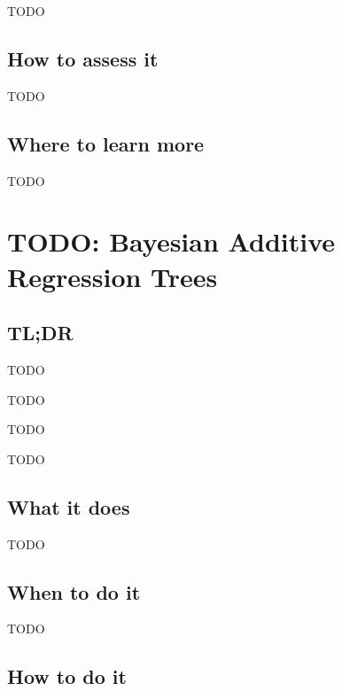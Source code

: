 \documentclass[
]{book}
\providecommand{\tightlist}{%
  \setlength{\itemsep}{0pt}\setlength{\parskip}{0pt}}
\begin{document}
TODO

\hypertarget{how-to-assess-it-17}{%
\section{How to assess it}\label{how-to-assess-it-17}}

TODO

\hypertarget{where-to-learn-more-17}{%
\section{Where to learn more}\label{where-to-learn-more-17}}

TODO

\hypertarget{bayesian-additive-regression-trees}{%
\chapter{TODO: Bayesian Additive Regression Trees}\label{bayesian-additive-regression-trees}}

\hypertarget{tldr-18}{%
\section{TL;DR}\label{tldr-18}}

\begin{description}
\tightlist
\item[What it does]
TODO
\item[When to do it]
TODO
\item[How to do it]
TODO
\item[How to assess it]
TODO
\end{description}

\hypertarget{what-it-does-18}{%
\section{What it does}\label{what-it-does-18}}

TODO

\hypertarget{when-to-do-it-18}{%
\section{When to do it}\label{when-to-do-it-18}}

TODO

\hypertarget{how-to-do-it-18}{%
\section{How to do it}\label{how-to-do-it-18}}
\end{document}
